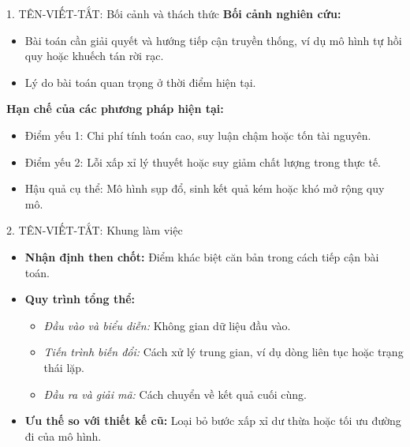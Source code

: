 \begin{frame}{1. TÊN-VIẾT-TẮT: Bối cảnh và thách thức}
    \textbf{Bối cảnh nghiên cứu:}
    \begin{itemize}
        \item Bài toán cần giải quyết và hướng tiếp cận truyền thống, ví dụ mô hình tự hồi quy hoặc khuếch tán rời rạc.
        \item Lý do bài toán quan trọng ở thời điểm hiện tại.
    \end{itemize}
    \vspace{0.2cm}
    \textbf{Hạn chế của các phương pháp hiện tại:}
    \begin{itemize}
        \item Điểm yếu 1: Chi phí tính toán cao, suy luận chậm hoặc tốn tài nguyên.
        \item Điểm yếu 2: Lỗi xấp xỉ lý thuyết hoặc suy giảm chất lượng trong thực tế.
        \item Hậu quả cụ thể: Mô hình sụp đổ, sinh kết quả kém hoặc khó mở rộng quy mô.
    \end{itemize}
\end{frame}

\begin{frame}{2. TÊN-VIẾT-TẮT: Khung làm việc}
    \begin{itemize}
        \item \textbf{Nhận định then chốt:} Điểm khác biệt căn bản trong cách tiếp cận bài toán.
        \item \textbf{Quy trình tổng thể:}
        \begin{itemize}
            \item \textit{Đầu vào và biểu diễn:} Không gian dữ liệu đầu vào.
            \item \textit{Tiến trình biến đổi:} Cách xử lý trung gian, ví dụ dòng liên tục hoặc trạng thái lặp.
            \item \textit{Đầu ra và giải mã:} Cách chuyển về kết quả cuối cùng.
        \end{itemize}
        \item \textbf{Ưu thế so với thiết kế cũ:} Loại bỏ bước xấp xỉ dư thừa hoặc tối ưu đường đi của mô hình.
    \end{itemize}
\end{frame}

